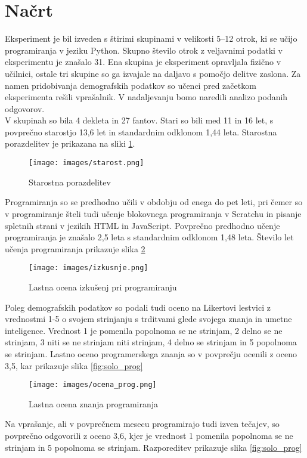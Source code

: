 \documentclass[a4paper,12pt,openright]{book}
\begin{document}
\section{Načrt}
Eksperiment je bil izveden s štirimi skupinami v velikosti 5–12 otrok, ki se učijo programiranja v jeziku Python. Skupno število otrok z veljavnimi podatki v eksperimentu je znašalo 31. Ena skupina je eksperiment opravljala fizično v učilnici, ostale tri skupine so ga izvajale na daljavo s pomočjo delitve zaslona. Za namen pridobivanja demografskih podatkov so učenci pred začetkom eksperimenta rešili vprašalnik. V nadaljevanju bomo naredili analizo podanih odgovorov.\\
V skupinah so bila 4 dekleta in 27 fantov. Stari so bili med 11 in 16 let, s povprečno starostjo 13,6 let in standardnim odklonom 1,44 leta. Starostna porazdelitev je prikazana na sliki \ref{fig:ages}. \\
\begin{figure}[H]
    \centering
    \texttt{[image: images/starost.png]}
    \caption{Starostna porazdelitev}
    \label{fig:ages}
\end{figure}
Programiranja so se predhodno učili v obdobju od enega do pet leti, pri čemer so v programiranje šteli tudi učenje blokovnega programiranja v Scratchu in pisanje spletnih strani v jezikih HTML in JavaScript. Povprečno predhodno učenje programiranja je znašalo 2,5 leta s standardnim odklonom 1,48 leta. Število let učenja programiranja prikazuje slika \ref{fig:izkusnje} \\
\begin{figure}[H]
    \centering
    \texttt{[image: images/izkusnje.png]}
    \caption{Lastna ocena izkušenj pri programiranju}
    \label{fig:izkusnje}
\end{figure}
Poleg demografskih podatkov so podali tudi oceno na Likertovi lestvici z vrednostmi 1-5 o svojem strinjanju s trditvami glede svojega znanja in umetne inteligence. Vrednost 1 je pomenila popolnoma se ne strinjam, 2 delno se ne strinjam, 3 niti se ne strinjam niti strinjam, 4 delno se strinjam in 5 popolnoma se strinjam. Lastno oceno programerskega znanja so v povprečju ocenili z oceno 3,5, kar prikazuje slika \ref{fig:solo_prog} \\
\begin{figure}[H]
    \centering
    \texttt{[image: images/ocena\_prog.png]}
    \caption{Lastna ocena znanja programiranja}
    \label{fig:ocena_prog}
\end{figure}
Na vprašanje, ali v povprečnem mesecu programirajo tudi izven tečajev, so povprečno odgovorili z oceno 3,6, kjer je vrednost 1 pomenila popolnoma se ne strinjam in 5 popolnoma se strinjam. Razporeditev prikazuje slika \ref{fig:solo_prog} \\
\end{document}
